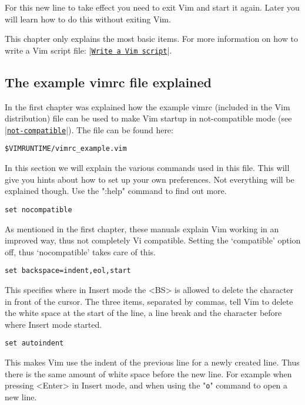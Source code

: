 For this new line to take effect you need to exit Vim and start it again.
Later you will learn how to do this without exiting Vim.

This chapter only explains the most basic items.
For more information on how to write a Vim script file: |\hyperref[Write a Vim script]{\texttt{Write a Vim script}}|.

\subsection{The example vimrc file explained}
\label{vimrc_example.vim}

In the first chapter was explained how the example vimrc (included in the Vim distribution) file can be used to make Vim startup in not-compatible mode (see \hyperref[not-compatible]{|\texttt{not-compatible}|}).
The file can be found here:

\begin{Verbatim}[samepage=true]
    $VIMRUNTIME/vimrc_example.vim 
\end{Verbatim}

In this section we will explain the various commands used in this file.
This will give you hints about how to set up your own preferences.
Not everything will be explained though.
Use the ":help" command to find out more.

 \begin{Verbatim}[samepage=true]
 set nocompatible
 \end{Verbatim}

As mentioned in the first chapter, these manuals explain Vim working in an improved way, thus not completely Vi compatible.
Setting the `compatible' option off, thus `nocompatible' takes care of this.

 \begin{Verbatim}[samepage=true]
 set backspace=indent,eol,start
 \end{Verbatim}

This specifies where in Insert mode the <BS> is allowed to delete the character in front of the cursor.
The three items, separated by commas, tell Vim to delete the white space at the start of the line, a line break and the character before where Insert mode started.

 \begin{Verbatim}[samepage=true]
 set autoindent
 \end{Verbatim}

This makes Vim use the indent of the previous line for a newly created line.
Thus there is the same amount of white space before the new line.
For example when pressing <Enter> in Insert mode, and when using the "\texttt{o}" command to open a new line.

